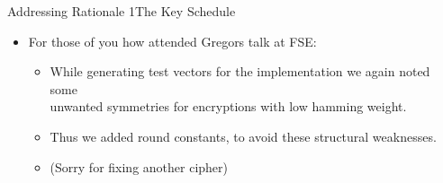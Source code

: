 \begin{frame}{Addressing Rationale 1}{The Key Schedule}
{{\begin{itemize}
              fullfils our requirements for linear independent round keys.
        \item For those of you how attended Gregors talk at FSE:
              \begin{itemize}
                  \item While generating test vectors for the implementation we again noted some\\
                        unwanted symmetries for encryptions with low hamming weight.
                  \item Thus we added round constants, to avoid these structural weaknesses.
                  \item (Sorry for fixing another cipher)
              \end{itemize}
    \end{itemize}}}
\end{frame}

